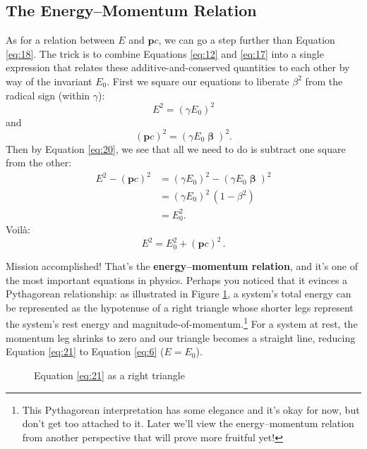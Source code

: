 \documentclass[12pt]{article}
\renewcommand{\vv}[1]{\mathbf{#1}}
\newcommand{\vvbeta}{\bm{\upbeta}}
\begin{document}
\subsection{The Energy--Momentum Relation}\label{ssec:em}

As for a relation between $E$ and $\vv p c$, we can go a step further than Equation \ref{eq:18}. The trick is to combine Equations \ref{eq:12} and \ref{eq:17} into a single expression that relates these additive-and-conserved quantities to each other by way of the invariant $E_0$. First we square our equations to liberate $\beta^2$ from the radical sign (within $\gamma$):
\begin{equation*}
E^2 = (\gamma E_0)^2
\end{equation*}
and
\begin{equation*}
(\vv p c)^2 = (\gamma E_0 \vvbeta)^2.
\end{equation*}
Then by Equation \ref{eq:20}, we see that all we need to do is subtract one square from the other:
\begin{equation*}
\begin{split}
E^2 - (\vv p c)^2 &= (\gamma E_0)^2 - (\gamma E_0 \vvbeta)^2 \\[2pt]
&= (\gamma E_0)^2 \, (1 - \beta^2) \\[2pt]
&= E_0^2.
\end{split}
\end{equation*}
Voil\`a:
\begin{equation}\label{eq:21}
\boxed{E^2=E_0^2+(\vv p c)^2} \, .
\end{equation}

Mission accomplished! That's the \textbf{energy--momentum relation}, and it's one of the most important equations in physics. Perhaps you noticed that it evinces a Pythagorean relationship: as illustrated in Figure \ref{f:1}, a system's total energy can be represented as the hypotenuse of a right triangle whose shorter legs represent the system's rest energy and magnitude-of-momentum.\footnote{This Pythagorean interpretation has some elegance and it's okay for now, but don't get too attached to it. Later we'll view the energy--momentum relation from another perspective that will prove more fruitful yet!} For a system at rest, the momentum leg shrinks to zero and our triangle becomes a straight line, reducing Equation \ref{eq:21} to Equation \ref{eq:6} ($E=E_0$).

\begin{figure}[h]
\centering
\caption{Equation \ref{eq:21} as a right triangle}
\label{f:1}
\vspace{10pt}
\end{figure}
\end{document}
